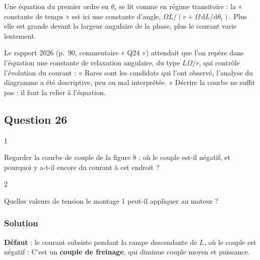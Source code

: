 \documentclass[11pt,a4paper]{article}
\newcommand{\equationajustee}[1]{%
  \sbox{\boiteequation}{$\displaystyle #1$}%
  \ifdim\wd\boiteequation>\linewidth
    \[\resizebox{\linewidth}{!}{\usebox{\boiteequation}}\]%
  \else
    \[#1\]%
  \fi}
\begin{document}
\begin{methode}

Une équation du premier ordre en \(\theta_{\mathrm r}\) se lit comme en régime transitoire : la « constante de temps » est ici une constante d'angle, \(\Omega L/(r+\Omega\,\mathrm dL/\mathrm d\theta_{\mathrm r})\). Plus elle est grande devant la largeur angulaire de la phase, plus le courant varie lentement.

\end{methode}

\begin{jury}

Le rapport 2026 (p.~90, commentaire « Q24 ») attendait que l'on repère dans l'équation une constante de relaxation angulaire, du type \(L\Omega/r\), qui contrôle l'évolution du courant : « Rares sont les candidats qui l'ont observé, l'analyse du diagramme a été descriptive, peu ou mal interprétée. » Décrire la courbe ne suffit pas : il faut la relier à l'équation.

\end{jury}

\hypertarget{question-26}{%
\subsection{Question 26}\label{question-26}}

\begin{indication}{1}

Regarder la courbe de couple de la figure 8 : où le couple est-il négatif, et pourquoi y a-t-il encore du courant à cet endroit ?

\end{indication}

\begin{indication}{2}

Quelles valeurs de tension le montage 1 peut-il appliquer au moteur ?

\end{indication}

\hypertarget{solution-25}{%
\subsubsection{Solution}\label{solution-25}}

\textbf{Défaut} : le courant subsiste pendant la rampe descendante de \(L\), où le couple est négatif :
\equationajustee{\Gamma=\frac12i^2\frac{\mathrm dL}{\mathrm d\theta_{\mathrm r}}<0}
C'est un \textbf{couple de freinage}, qui diminue couple moyen et puissance.
\end{document}
